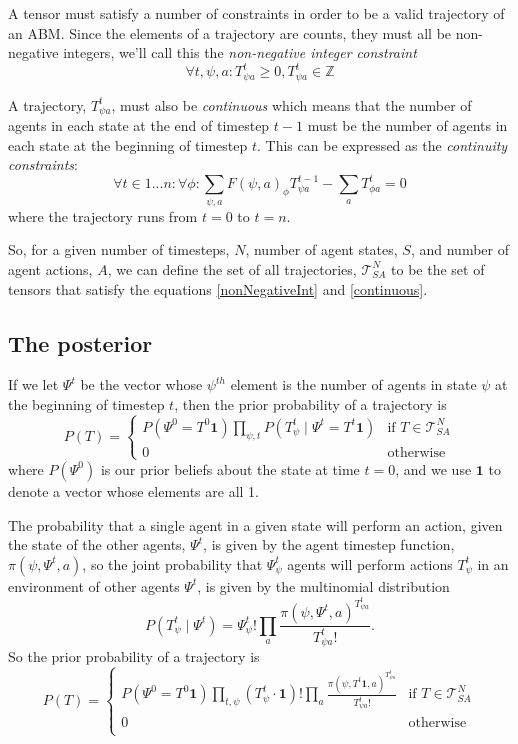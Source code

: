 \documentclass{article}
\begin{document}
A tensor must satisfy a number of constraints in order to be a valid trajectory of an ABM. Since the elements of a trajectory are counts, they must all be non-negative integers, we'll call this the \textit{non-negative integer constraint}
\begin{equation}
\forall t,\psi, a: T^t_{\psi a} \ge 0, T^t_{\psi a} \in \mathbb{Z}
\label{nonNegativeInt}
\end{equation}

A trajectory, $T^t_{\psi a}$, must also be \textit{continuous} which means that the number of agents in each state at the end of timestep $t-1$ must be the number of agents in each state at the beginning of timestep $t$. This can be expressed as the \textit{continuity constraints}:
\begin{equation}
\forall t \in 1 ... n:\forall \phi: \sum_{\psi, a} F(\psi, a)_\phi T^{t-1}_{\psi a} - \sum_a T^t_{\phi a} = 0
\label{continuous}
\end{equation}
where the trajectory runs from $t=0$ to $t=n$.

So, for a given number of timesteps, $N$, number of agent states, $S$, and number of agent actions, $A$, we can define the set of all trajectories, $\mathcal{T}^N_{SA}$ to be the set of tensors that satisfy the equations \ref{nonNegativeInt} and \ref{continuous}.

\subsection{The posterior}

If we let $\Psi^t$ be the vector whose $\psi^{th}$ element is the number of agents in state $\psi$ at the beginning of timestep $t$, then the prior probability of a trajectory is
\[
P(T) =
\begin{cases}
P\left(\Psi^0 = T^0 \mathbf{1} \right) \prod_{\psi, t} P\left(T^t_{\psi} \mid \Psi^t = T^t \mathbf{1}\right) & \text{if } T \in \mathcal{T}^N_{SA} \\
0 & \text{otherwise}
\end{cases}
\]
where $P(\Psi^0)$ is our prior beliefs about the state at time $t=0$, and we use $\mathbf{1}$ to denote a vector whose elements are all 1.


The probability that a single agent in a given state will perform an action, given the state of the other agents, $\Psi^t$, is given by the agent timestep function, $\pi(\psi,\Psi^t,a)$, so the joint probability that $\Psi^t_\psi$ agents will perform actions $T^t_{\psi}$ in an environment of other agents $\Psi^t$, is given by the multinomial distribution
\[
P\left(T^t_{\psi} \mid \Psi^t \right) = \Psi^t_\psi!\prod_a \frac{\pi(\psi,\Psi^t,a)^{T^{t}_{\psi a}}}{T^{t}_{\psi a}!}.
\]
So the prior probability of a trajectory is
\[
P(T) =
\begin{cases}
P(\Psi^0 = T^0\mathbf{1})
\prod_{t, \psi}\left(T^t_{\psi} \cdot \mathbf{1} \right)!
\prod_a \frac{\pi(\psi, T^{t}\mathbf{1},a)^{T^{t}_{\psi a}}}{T^{t}_{\psi a}!} & \text{if } T \in \mathcal{T}^N_{SA} \\
0 & \text{otherwise}\\
\end{cases}
\]
\end{document}
